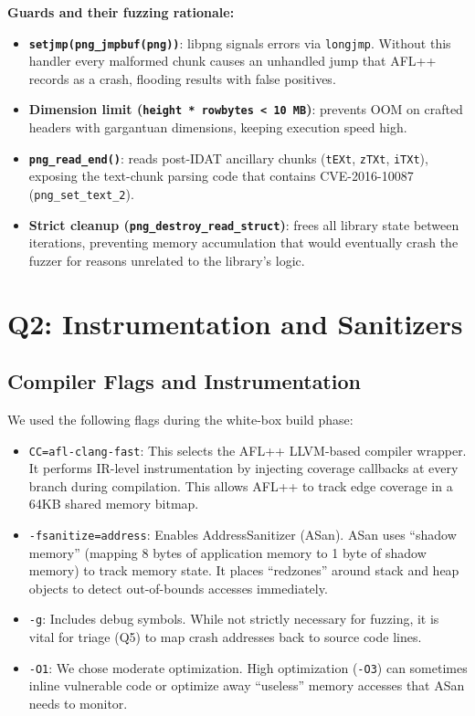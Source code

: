 \documentclass[letterpaper,twocolumn,10pt]{article}
\begin{document}
\textbf{Guards and their fuzzing rationale:}
\begin{itemize}[leftmargin=*]
    \item \textbf{\texttt{setjmp(png\_jmpbuf(png))}}: libpng signals errors via
    \texttt{longjmp}. Without this handler every malformed chunk causes an
    unhandled jump that AFL++ records as a crash, flooding results with false
    positives.
    \item \textbf{Dimension limit (\texttt{height * rowbytes < 10\,MB})}: prevents
    OOM on crafted headers with gargantuan dimensions, keeping execution speed high.
    \item \textbf{\texttt{png\_read\_end()}}: reads post-IDAT ancillary chunks
    (\texttt{tEXt}, \texttt{zTXt}, \texttt{iTXt}), exposing the text-chunk parsing
    code that contains CVE-2016-10087 (\texttt{png\_set\_text\_2}).
    \item \textbf{Strict cleanup (\texttt{png\_destroy\_read\_struct})}: frees all
    library state between iterations, preventing memory accumulation that would
    eventually crash the fuzzer for reasons unrelated to the library's logic.
\end{itemize}

\section{Q2: Instrumentation and Sanitizers}

\subsection{Compiler Flags and Instrumentation}
We used the following flags during the white-box build phase:

\begin{itemize}
    \item \texttt{CC=afl-clang-fast}: This selects the AFL++ LLVM-based compiler
    wrapper. It performs IR-level instrumentation by injecting coverage callbacks
    at every branch during compilation. This allows AFL++ to track edge coverage
    in a 64KB shared memory bitmap.
    \item \texttt{-fsanitize=address}: Enables AddressSanitizer (ASan). ASan uses
    ``shadow memory'' (mapping 8 bytes of application memory to 1 byte of shadow
    memory) to track memory state. It places ``redzones'' around stack and heap
    objects to detect out-of-bounds accesses immediately.
    \item \texttt{-g}: Includes debug symbols. While not strictly necessary for
    fuzzing, it is vital for triage (Q5) to map crash addresses back to source
    code lines.
    \item \texttt{-O1}: We chose moderate optimization. High optimization
    (\texttt{-O3}) can sometimes inline vulnerable code or optimize away
    ``useless'' memory accesses that ASan needs to monitor.
\end{itemize}
\end{document}
